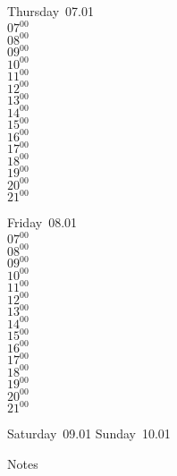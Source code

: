 \documentclass[11pt,a4paper]{book}\usepackage[]{graphicx}\usepackage[]{color}
\begin{document}
\clearpage
\begin{headerbox}
\end{headerbox}
\begin{weekdaybox}
  Thursday~07.01\\
  { 
  \vfill
  $07^{00}$\\
$08^{00}$\\
$09^{00}$\\
$10^{00}$\\
$11^{00}$\\
$12^{00}$\\
$13^{00}$\\
$14^{00}$\\
$15^{00}$\\
$16^{00}$\\
$17^{00}$\\
$18^{00}$\\
$19^{00}$\\
$20^{00}$\\
$21^{00}$\\
  }
\end{weekdaybox} 
\begin{weekdaybox}
  Friday~08.01\\
  { 
  \vfill
  $07^{00}$\\
$08^{00}$\\
$09^{00}$\\
$10^{00}$\\
$11^{00}$\\
$12^{00}$\\
$13^{00}$\\
$14^{00}$\\
$15^{00}$\\
$16^{00}$\\
$17^{00}$\\
$18^{00}$\\
$19^{00}$\\
$20^{00}$\\
$21^{00}$\\
  }
\end{weekdaybox}
\begin{weekendbox}
  Saturday~09.01
  \tcblower
  Sunday~10.01
\end{weekendbox} %
\begin{notebox}
  Notes
\end{notebox}
\clearpage
\end{document}
